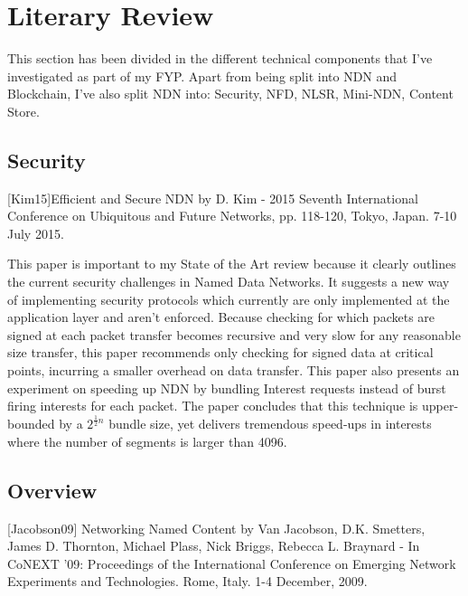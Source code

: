 \section{Literary Review}
This section has been divided in the different technical components that I've investigated as part of my FYP. Apart from being split into NDN and Blockchain, I've also split NDN into: Security, NFD, NLSR, Mini-NDN, Content Store.

\subsection{Security}
[Kim15]Efficient and Secure NDN by D. Kim - 2015 Seventh International Conference on Ubiquitous and Future Networks, pp. 118-120, Tokyo, Japan. 7-10 July 2015.

This paper is important to my State of the Art review because it clearly outlines the current security challenges in Named Data Networks. It suggests a new way of implementing security protocols which currently are only implemented at the application layer and aren’t enforced. Because checking for which packets are signed at each packet transfer becomes recursive and very slow for any reasonable size transfer, this paper recommends only checking for signed data at critical points, incurring a smaller overhead on data transfer. This paper also presents an experiment on speeding up NDN by bundling Interest requests instead of burst firing interests for each packet. The paper concludes that this technique is upper-bounded by a $2^{\frac{1}{2}n}$ bundle size, yet delivers tremendous speed-ups in interests where the number of segments is larger than 4096.

\subsection{Overview}
[Jacobson09] Networking Named Content by Van Jacobson, D.K. Smetters, James D. Thornton, Michael Plass, Nick Briggs, Rebecca L. Braynard - In CoNEXT '09: Proceedings of the  International Conference on Emerging Network Experiments and Technologies. Rome, Italy. 1-4 December, 2009.

